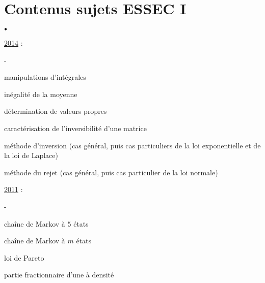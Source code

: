 \documentclass[11pt]{book}%
\begin{document}
\chapter*{Contenus sujets ESSEC I}


\begin{noliste}{$\scriptstyle \bullet$}
 \item \underline{2014} :
 \begin{noliste}{-}
  \item manipulations d'intégrales
  
  \item inégalité de la moyenne
  
  \item détermination de valeurs propres
  
  \item caractérisation de l'inversibilité d'une matrice
  
  \item méthode d'inversion (cas général, puis cas particuliers de la 
  loi exponentielle et de la loi de Laplace)
  
  \item méthode du rejet (cas général, puis cas particulier de la loi 
  normale)
 \end{noliste}
 
 \item \underline{2011} :
 \begin{noliste}{-}
  \item chaîne de Markov à $5$ états
  
  \item chaîne de Markov à $m$ états
  
  \item loi de Pareto
  
  \item partie fractionnaire d'une \var à densité
 \end{noliste}
\end{noliste}
\end{document}
